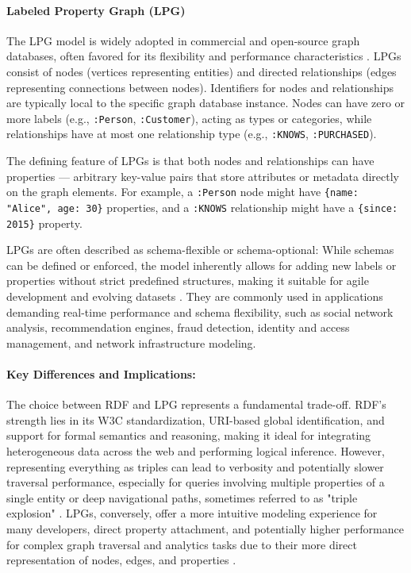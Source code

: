 \documentclass[sigconf,natbib=false]{acmart}
\begin{document}
\paragraph{Labeled Property Graph (LPG)}
The LPG model is widely adopted in commercial and open-source graph databases, often favored for its flexibility and performance characteristics \cite{LPGVsRDF,howard2024RDFVsProperty,KnowledgeGraphsRDF}. %
LPGs consist of nodes (vertices representing entities) and directed relationships (edges representing connections between nodes)\cite{IntroductionCypherManual,francis2018CypherEvolvingQuery}.
Identifiers for nodes and relationships are typically local to the specific graph database instance.
Nodes can have zero or more labels (e.g., \texttt{:Person}, \texttt{:Customer}), acting as types or categories, while relationships have at most one relationship type (e.g., \texttt{:KNOWS}, \texttt{:PURCHASED}).

The defining feature of LPGs is that both nodes and relationships can have properties --- arbitrary key-value pairs that store attributes or metadata directly on the graph elements.
For example, a \texttt{:Person} node might have \texttt{\{name: "Alice", age: 30\}} properties, and a \texttt{:KNOWS} relationship might have a \texttt{\{since: 2015\}} property.

LPGs are often described as schema-flexible or schema-optional: While schemas can be defined or enforced, the model inherently allows for adding new labels or properties without strict predefined structures, making it suitable for agile development and evolving datasets \cite{deutsch2022GraphPatternMatching}.
They are commonly used in applications demanding real-time performance and schema flexibility, such as social network analysis, recommendation engines, fraud detection, identity and access management, and network infrastructure modeling. %

\paragraph{Key Differences and Implications:}
The choice between RDF and LPG represents a fundamental trade-off.
RDF's strength lies in its W3C standardization, URI-based global identification, and support for formal semantics and reasoning, making it ideal for integrating heterogeneous data across the web and performing logical inference. %
However, representing everything as triples can lead to verbosity and potentially slower traversal performance, especially for queries involving multiple properties of a single entity or deep navigational paths, sometimes referred to as "triple explosion" \cite{shimizu2024KnowWhereGraphOntology}.
LPGs, conversely, offer a more intuitive modeling experience for many developers, direct property attachment, and potentially higher performance for complex graph traversal and analytics tasks due to their more direct representation of nodes, edges, and properties \cite{abreuChoosingGraphDatabases}.
\end{document}
